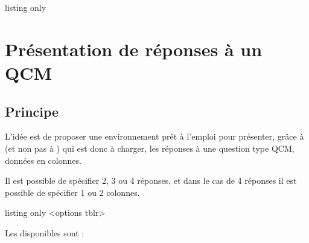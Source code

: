 \documentclass[french,11pt,a4paper]{article}
\begin{document}
\begin{DemoCode}{listing only}
\usepackage{customenvs}

\usepackage[option(s)]{customenvs}
\end{DemoCode}

\newpage

\section{Présentation de réponses à un QCM}

\subsection{Principe}

L'idée est de proposer une environnement prêt à l'emploi pour présenter, grâce à  (et non pas à ) qui est donc à charger, les réponses à une question type QCM, données en colonnes.

\smallskip

Il est possible de spécifier 2, 3 ou 4 réponses, et dans le cas de 4 réponses il est possible de spécifier 1 ou 2 colonnes.

\begin{DemoCode}{listing only}
<options tblr>
\end{DemoCode}

Les  disponibles sont :
\end{document}
